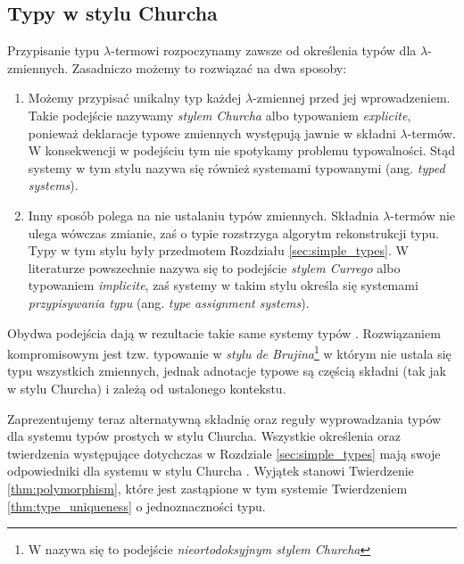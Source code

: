 \subsection{Typy w stylu Churcha}\label{subsec:church_style}
Przypisanie typu \(\lambda\)-termowi rozpoczynamy zawsze od określenia typów dla \(\lambda\)-zmiennych. Zasadniczo możemy to rozwiązać na dwa sposoby:

\begin{enumerate}
  \item Możemy przypisać unikalny typ każdej \(\lambda\)-zmiennej przed jej wprowadzeniem. Takie podejście nazywamy \emph{stylem Churcha} albo typowaniem \emph{explicite}, ponieważ deklaracje typowe zmiennych występują jawnie w składni \(\lambda\)-termów. W konsekwencji w podejściu tym nie spotykamy problemu typowalności. Stąd systemy w tym stylu nazywa się również systemami {typowanymi} (ang. \emph{typed systems}).
  \item Inny sposób polega na nie ustalaniu typów zmiennych. Składnia \(\lambda\)-termów nie ulega wówczas zmianie, zaś o typie rozstrzyga algorytm rekonstrukcji typu. Typy w tym stylu były przedmotem Rozdziału \ref{sec:simple_types}. W literaturze powszechnie nazywa się to podejście \emph{stylem Currego} albo typowaniem \emph{implicite}, zaś systemy w takim stylu określa się systemami \emph{przypisywania typu} (ang. \emph{type assignment systems}).
\end{enumerate}

Obydwa podejścia dają w rezultacie takie same systemy typów \cite[Rozdział 3.4]{Urzyczyn2006}.  %
Rozwiązaniem kompromisowym jest tzw. typowanie w \emph{stylu de Brujina}\footnote{W \cite{Urzyczyn2006} nazywa się to podejście \emph{nieortodoksyjnym stylem Churcha}} \cite[1A.33]{barendregt_dekkers_statman_2013} w którym nie ustala się typu wszystkich zmiennych, jednak adnotacje typowe są częścią składni (tak jak w stylu Churcha) i zależą od ustalonego kontekstu. 

Zaprezentujemy teraz alternatywną składnię oraz reguły wyprowadzania typów dla systemu typów prostych w stylu Churcha. Wszystkie określenia oraz twierdzenia występujące dotychczas w Rozdziale \ref{sec:simple_types} mają swoje odpowiedniki dla systemu w stylu Churcha \cite[Rozdział 2.10]{nederpelt_geuvers_2014}. Wyjątek stanowi Twierdzenie \ref{thm:polymorphism}, które jest zastąpione w tym systemie Twierdzeniem \ref{thm:type_uniqueness} o jednoznaczności typu.

